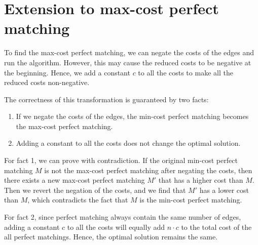 \documentclass[a4paper,12pt]{article}
\begin{document}
\section{Extension to max-cost perfect matching}

To find the max-cost perfect matching, we can negate the costs of the edges and run the algorithm.
However, this may cause the reduced costs to be negative at the beginning.
Hence, we add a constant $c$ to all the costs to make all the reduced costs non-negative.

The correctness of this transformation is guaranteed by two facts:
\begin{enumerate}
	\item If we negate the costs of the edges, the min-cost perfect matching becomes the max-cost perfect matching.
	\item Adding a constant to all the costs does not change the optimal solution.
\end{enumerate}

For fact 1, we can prove with contradiction.
If the original min-cost perfect matching $M$ is not the max-cost perfect matching after negating the costs, then there exists a new max-cost perfect matching $M'$ that has a higher cost than $M$.
Then we revert the negation of the costs, and we find that $M'$ has a lower cost than $M$, which contradicts the fact that $M$ is the min-cost perfect matching.

For fact 2, since perfect matching always contain the same number of edges, adding a constant $c$ to all the costs will equally add $n \cdot c$ to the total cost of the all perfect matchings.
Hence, the optimal solution remains the same.
\end{document}
